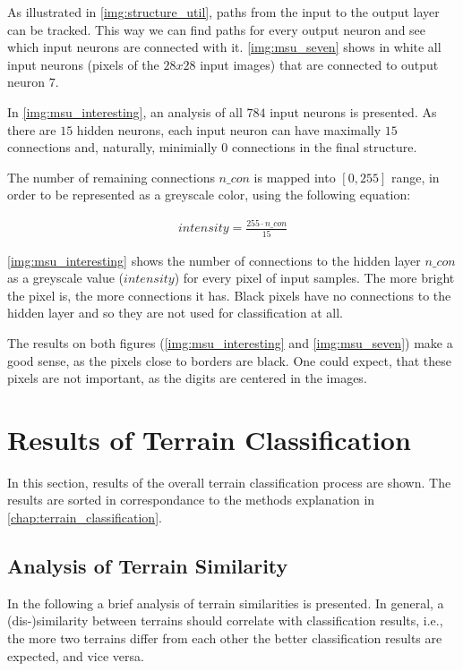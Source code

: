 As illustrated in \cref{img:structure_util}, paths from the input to the output layer can be tracked. This way we can find paths for every output neuron and see which input neurons are connected with it. \cref{img:msu_seven} shows in white all input neurons (pixels of the $ 28x28 $ input images) that are connected to output neuron $ 7 $.

In \cref{img:msu_interesting}, an analysis of all $ 784 $ input neurons is presented. As there are $ 15 $ hidden neurons, each input neuron can have maximally $ 15 $ connections and, naturally, minimially $ 0 $ connections in the final structure. 

The number of remaining connections $ n\_con $ is mapped into $ [0, 255] $ range, in order to be represented as a greyscale color, using the following equation:

\begin{align} \label{eq:grayscale_mapping}
intensity = \frac{255 \cdot n\_con}{15}
\end{align}

\cref{img:msu_interesting} shows the number of connections to the hidden layer $ n\_con $ as a greyscale value ($ intensity $) for every pixel of input samples. The more bright the pixel is, the more connections it has. Black pixels have no connections to the hidden layer and so they are not used for classification at all.

The results on both figures (\ref{img:msu_interesting} and \ref{img:msu_seven}) make a good sense, as the pixels close to borders are black. One could expect, that these pixels are not important, as the digits are centered in the images.

\section{Results of Terrain Classification} \label{sec:terrain_processing_results}
In this section, results of the overall terrain classification process are shown. The results are sorted in correspondance to the methods explanation in \cref{chap:terrain_classification}.

\subsection{Analysis of Terrain Similarity} \label{ssec:terrains_analysis}
In the following a brief analysis of terrain similarities is presented. In general, a (dis-)similarity between terrains should correlate with classification results, i.e., the more two terrains differ from each other the better classification results are expected, and vice versa.


